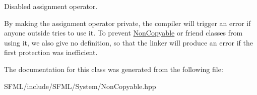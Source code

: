 Disabled assignment operator. 

By making the assignment operator private, the compiler will trigger an error if anyone outside tries to use it. To prevent \mbox{\hyperlink{classsf_1_1_non_copyable}{Non\+Copyable}} or friend classes from using it, we also give no definition, so that the linker will produce an error if the first protection was inefficient. \begin{DoxyVerb}\end{DoxyVerb}
 

The documentation for this class was generated from the following file\+:\begin{DoxyCompactItemize}
\item 
S\+F\+M\+L/include/\+S\+F\+M\+L/\+System/Non\+Copyable.\+hpp\end{DoxyCompactItemize}
